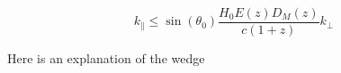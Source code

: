 \begin{equation}
    k_{\parallel} \leq \sin \left( \theta_0 \right) \frac{H_0 E \left( z \right) D_{M}\left( z \right)}{c \left(1 + z\right)} k_{\perp}
\end{equation}

Here is an explanation of the wedge
